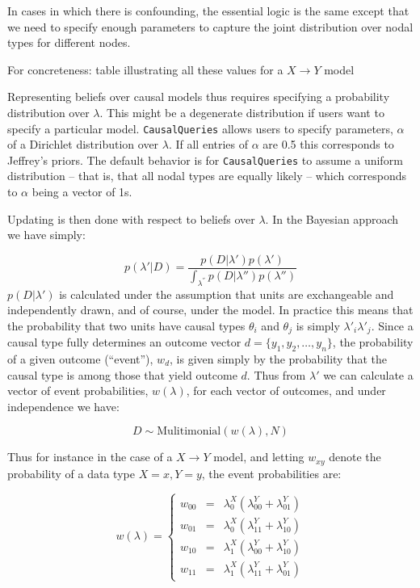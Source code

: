 \documentclass[
  11pt,
  article]{jss}
\begin{document}
In cases in which there is confounding, the essential logic is the same
except that we need to specify enough parameters to capture the joint
distribution over nodal types for different nodes.

For concreteness: table illustrating all these values for a
\(X\rightarrow Y\) model

Representing beliefs over causal models thus requires specifying a
probability distribution over \(\lambda\). This might be a degenerate
distribution if users want to specify a particular model.
\texttt{CausalQueries} allows users to specify parameters, \(\alpha\) of
a Dirichlet distribution over \(\lambda\). If all entries of \(\alpha\)
are 0.5 this corresponds to Jeffrey's priors. The default behavior is
for \texttt{CausalQueries} to assume a uniform distribution -- that is,
that all nodal types are equally likely -- which corresponds to
\(\alpha\) being a vector of 1s.

Updating is then done with respect to beliefs over \(\lambda\). In the
Bayesian approach we have simply:

\[p(\lambda'|D) = \frac{p(D|\lambda')p(\lambda')}{\int_{\lambda^{''}} p(D|\lambda'')p(\lambda'')}\]
\(p(D|\lambda')\) is calculated under the assumption that units are
exchangeable and independently drawn, and of course, under the model. In
practice this means that the probability that two units have causal
types \(\theta_i\) and \(\theta_j\) is simply \(\lambda'_i\lambda'_j\).
Since a causal type fully determines an outcome vector
\(d = \{y_1, y_2,\dots,y_n\}\), the probability of a given outcome
(``event''), \(w_d\), is given simply by the probability that the causal
type is among those that yield outcome \(d\). Thus from \(\lambda'\) we
can calculate a vector of event probabilities, \(w(\lambda)\), for each
vector of outcomes, and under independence we have:

\[D \sim \text{Mulitimonial}(w(\lambda), N)\]

Thus for instance in the case of a \(X \rightarrow Y\) model, and
letting \(w_{xy}\) denote the probability of a data type \(X=x, Y=y\),
the event probabilities are:

\[w(\lambda) = \left\{\begin{array}{ccc} w_{00} & = & \lambda^X_0(\lambda^Y_{00} + \lambda^Y_{01})\\ 
w_{01} & = & \lambda^X_0(\lambda^Y_{11} + \lambda^Y_{10})\\
w_{10} & = & \lambda^X_1(\lambda^Y_{00} + \lambda^Y_{10})\\
w_{11} & = & \lambda^X_1(\lambda^Y_{11} + \lambda^Y_{01})\end{array} \right.\]
\end{document}
